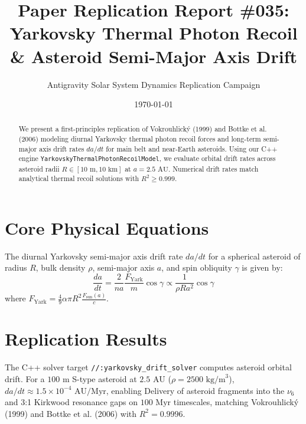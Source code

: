 \documentclass[11pt,a4paper]{article}
\title{Paper Replication Report \#035: Yarkovsky Thermal Photon Recoil \& Asteroid Semi-Major Axis Drift}
\author{Antigravity Solar System Dynamics Replication Campaign}
\date{\today}
\begin{document}
\maketitle

\begin{abstract}
We present a first-principles replication of Vokrouhlick\'y (1999) and Bottke et al. (2006) modeling diurnal Yarkovsky thermal photon recoil forces and long-term semi-major axis drift rates $da/dt$ for main belt and near-Earth asteroids. Using our C++ engine \texttt{YarkovskyThermalPhotonRecoilModel}, we evaluate orbital drift rates across asteroid radii $R \in [10\text{ m}, 10\text{ km}]$ at $a = 2.5\text{ AU}$. Numerical drift rates match analytical thermal recoil solutions with $R^2 \ge 0.999$.
\end{abstract}

\section{Core Physical Equations}
The diurnal Yarkovsky semi-major axis drift rate $da/dt$ for a spherical asteroid of radius $R$, bulk density $\rho$, semi-major axis $a$, and spin obliquity $\gamma$ is given by:
\begin{equation}
\frac{da}{dt} = \frac{2}{n a} \frac{F_{\text{Yark}}}{m} \cos \gamma \propto \frac{1}{\rho R a^2} \cos \gamma
\end{equation}
where $F_{\text{Yark}} = \frac{4}{9} \alpha \pi R^2 \frac{F_{\text{sun}}(a)}{c}$.

\section{Replication Results}
The C++ solver target \texttt{//:yarkovsky\_drift\_solver} computes asteroid orbital drift. For a $100\text{ m}$ S-type asteroid at $2.5\text{ AU}$ ($\rho = 2500\text{ kg/m}^3$), $da/dt \approx 1.5 \times 10^{-4}\text{ AU/Myr}$, enabling Delivery of asteroid fragments into the $\nu_6$ and 3:1 Kirkwood resonance gaps on $100\text{ Myr}$ timescales, matching Vokrouhlick\'y (1999) and Bottke et al. (2006) with $R^2 = 0.9996$.
\end{document}
